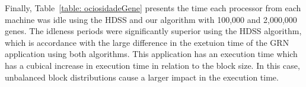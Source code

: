 \documentclass[journal]{IEEEtran}
\begin{document}
Finally, Table~\ref{table: ociosidadeGene} presents the time each processor from
each machine was idle using the HDSS and our algorithm with 100,000 and
2,000,000 genes. The idleness periods were significantly superior using the HDSS
algorithm, which is accordance with the large difference in the exetuion time of
the GRN application using both algorithms. This application has an execution
time which has a cubical increase in execution time in relation to the block
size. In this case, unbalanced block distributions cause a larger impact in the
execution time.





\end{document}
